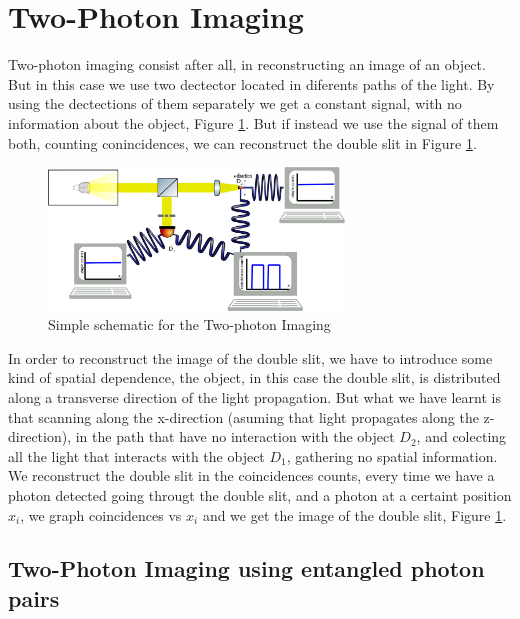 \section{Two-Photon Imaging}
Two-photon imaging consist after all, in reconstructing an image of an object. But in this case we use two dectector located in diferents paths of the light. By using the dectections of them separately we get a constant signal, with no information about the object, Figure \ref{fig:twoPhotonSetup}. But if instead we use the signal of them both, counting conincidences, we can reconstruct the double slit in Figure \ref{fig:twoPhotonSetup}. \\


\begin{figure}[h]
\centering
\includegraphics[width=0.7\textwidth]{Figures/twoPhotonSetup.png}
\caption{Simple schematic for the Two-photon Imaging} 
\label{fig:twoPhotonSetup}
\end{figure}
In order to reconstruct the image of the double slit, we have to introduce some kind of spatial dependence, the object, in this case the double slit, is distributed along a transverse direction of the light propagation. But what we have learnt is that scanning along the x-direction (asuming that light propagates along the z-direction), in the path that have no interaction with the object $D_2$, and colecting all the light that interacts with the object $D_1$, gathering no spatial information. We reconstruct the double slit in the coincidences counts, every time we have a photon detected going througt the double slit, and a photon at a certaint position $x_i$, we graph coincidences vs ${ x_i }$ and we get the image of the double slit, Figure \ref{fig:twoPhotonSetup}. 

\subsection{Two-Photon Imaging using entangled photon pairs}

